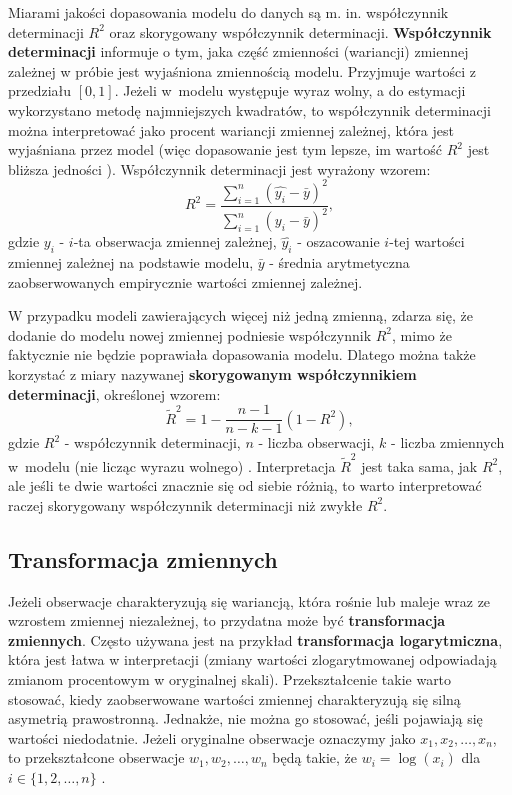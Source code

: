 \documentclass[12pt]{mwbk}
\theoremstyle{plain}
\theoremstyle{definition}
\theoremstyle{definition}
\begin{document}
Miarami jakości dopasowania modelu do danych są m. in. współczynnik determinacji $R^2$ oraz skorygowany współczynnik determinacji. \textbf{Współczynnik determinacji} informuje o tym, jaka część zmienności (wariancji) zmiennej zależnej w próbie jest wyjaśniona zmiennością modelu. Przyjmuje wartości z przedziału $[0,1]$. Jeżeli w~modelu występuje wyraz wolny, a do estymacji wykorzystano metodę najmniejszych kwadratów, to współczynnik determinacji można interpretować jako procent wariancji zmiennej zależnej, która jest wyjaśniana przez model (więc dopasowanie jest tym lepsze, im wartość $R^2$ jest bliższa jedności \cite{r2}). Współczynnik determinacji jest wyrażony wzorem:
$$R^2=\frac{\sum\limits_{i=1}^{n}(\hat{y_i}-\bar{y})^2}{\sum\limits_{i=1}^{n}(y_i-\bar{y})^2},$$ gdzie $y_i$ - $i$-ta obserwacja zmiennej zależnej, $\hat{y_i}$ - oszacowanie $i$-tej wartości zmiennej zależnej na podstawie modelu, $\bar{y}$ - średnia arytmetyczna zaobserwowanych empirycznie wartości zmiennej zależnej.

W przypadku modeli zawierających więcej niż jedną zmienną, zdarza się, że dodanie do modelu nowej zmiennej podniesie współczynnik $R^2$, mimo że faktycznie nie będzie poprawiała dopasowania modelu. Dlatego można także korzystać z miary nazywanej \textbf{skorygowanym współczynnikiem determinacji}, określonej wzorem:
$$\tilde{R}^2=1-\frac{n-1}{n-k-1}(1-R^2),$$
gdzie $R^2$ - współczynnik determinacji, $n$ - liczba obserwacji, $k$ - liczba zmiennych w~modelu (nie licząc wyrazu wolnego) \cite{skorygowany}. Interpretacja $\tilde{R}^2$ jest taka sama, jak $R^2$, ale jeśli te dwie wartości znacznie się od siebie różnią, to warto interpretować raczej skorygowany współczynnik determinacji niż zwykłe $R^2$.

\subsection{Transformacja zmiennych}

Jeżeli obserwacje charakteryzują się wariancją, która rośnie lub maleje wraz ze wzrostem zmiennej niezależnej, to przydatna może być \textbf{transformacja zmiennych}. Często używana jest na przykład \textbf{transformacja logarytmiczna}, która jest łatwa w interpretacji (zmiany wartości zlogarytmowanej odpowiadają zmianom procentowym w oryginalnej skali). Przekształcenie takie warto stosować, kiedy zaobserwowane wartości zmiennej charakteryzują się silną asymetrią prawostronną. Jednakże, nie można go stosować, jeśli pojawiają się wartości niedodatnie. Jeżeli oryginalne obserwacje oznaczymy jako $x_1, x_2,\ldots, x_n$, to przekształcone obserwacje $w_1, w_2,\ldots,w_n$ będą takie, że $w_i=\log(x_i)$ dla $i \in \lbrace{1,2,\ldots,n\rbrace}$ \cite{forecasting}.
\end{document}
